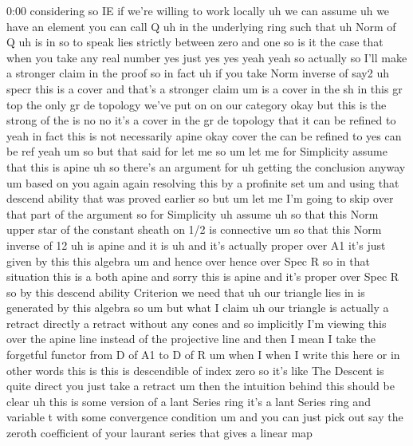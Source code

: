 \begin{unfinished}{0:00}
considering
so
IE  if  we're  willing  to  work
locally  uh  we  can
assume  uh  we  have  an  element  you  can
call  Q  uh  in  the  underlying  ring  such
that  uh  Norm  of  Q  uh  is  in  so  to
speak  lies  strictly  between  zero  and
one  so  is  it  the  case  that  when  you  take
any  real
number  yes  just  yes  yes  yeah  yeah  so
actually  so  I'll  make  a  stronger  claim
in  the  proof  so  in
fact  uh  if  you  take  Norm  inverse  of
say2  uh
specr  this  is  a
cover  and  that's  a  stronger  claim  um  is
a  cover  in  the  sh  in  this  gr  top  the
only  gr  de  topology  we've  put  on  on  our
category  okay  but  this  is  the  strong  of
the
is
no  no  it's  a  cover  in  the  gr  de  topology
that  it  can  be  refined  to  yeah  in  fact
this  is  not  necessarily
apine
okay  cover  the  can  be  refined  to  yes  can
be
ref
yeah
um  so  but  that  said  for  let  me  so  um  let
me  for  Simplicity  assume  that  this  is
apine  uh  so  there's  an  argument  for  uh
getting  the  conclusion  anyway  um
based  on  you  again  again  resolving  this
by  a  profinite  set  um  and  using  that
descend  ability  that  was  proved  earlier
so  but  um  let  me  I'm  going  to  skip  over
that  part  of  the  argument  so  for
Simplicity  uh
assume  uh  so  that  this  Norm  upper  star
of  the  constant  sheath  on  1/2  is
connective  um  so  that  this  Norm  inverse
of
12  uh  is
apine  and  it  is  uh  and  it's  actually
proper  over
A1  it's  just  given  by  this  this  algebra
um  and  hence
over  hence  over  Spec
R  so  in  that  situation  this  is  a  both
apine  and  sorry  this  is  apine  and  it's
proper  over  Spec  R  so  by  this  descend
ability  Criterion  we  need  that  uh  our
triangle  lies  in  is  generated  by  this
algebra
so
um  but  what  I
claim  uh  our  triangle  is  actually  a
retract  directly  a  retract  without  any
cones
and  so  implicitly  I'm  viewing  this  over
the  apine  line  instead  of  the  projective
line  and  then  I  mean  I  take  the
forgetful  functor  from  D  of  A1  to  D  of  R
um  when  I  when  I  write  this
here  or  in  other  words  this  is  this  is
descendible  of  index  zero  so  it's  like
The  Descent  is  quite  direct  you  just
take  a
retract
um  then  the  intuition  behind  this  should
be  clear  uh  this  is  some  version  of  a
lant  Series  ring  it's  a  lant  Series  ring
and  variable  t  with  some  convergence
condition  um  and  you  can  just  pick  out
say  the  zeroth  coefficient  of  your
laurant  series  that  gives  a  linear  map

\end{unfinished}
